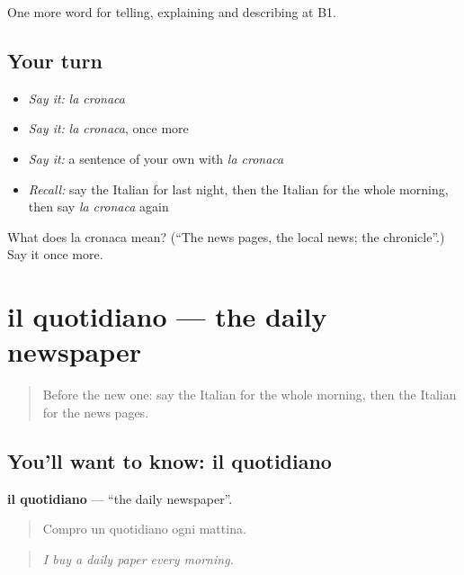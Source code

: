 \begin{grammarlens}[title={What you've built}]
One more word for telling, explaining and describing at B1.
\end{grammarlens}

\subsection*{Your turn}
\begin{itemize}
\raggedright
  \item \emph{Say it:} \emph{la cronaca}
  \item \emph{Say it:} \emph{la cronaca}, once more
  \item \emph{Say it:} a sentence of your own with \emph{la cronaca}
  \item \emph{Recall:} say the Italian for last night, then the Italian for the whole morning, then say \emph{la cronaca} again
\end{itemize}

\begin{tcolorbox}[breakable,colback=teal!4,colframe=teal!35!black,title={Before you move on}]
What does la cronaca mean? (\textquotedblleft{}The news pages, the local news; the chronicle\textquotedblright{}.) Say it once more.
\end{tcolorbox}
\section[il quotidiano]{il quotidiano — the daily newspaper}

\label{lesson:IT-C282-quotidiano}



\begin{quote}
Before the new one: say the Italian for the whole morning, then the Italian for the news pages.
\end{quote}

\subsection*{You'll want to know: il quotidiano}
\textbf{il quotidiano} — \textquotedblleft{}the daily newspaper\textquotedblright{}.

\begin{quote}
Compro un quotidiano ogni mattina.
\end{quote}

\begin{quote}
\emph{I buy a daily paper every morning.}
\end{quote}


